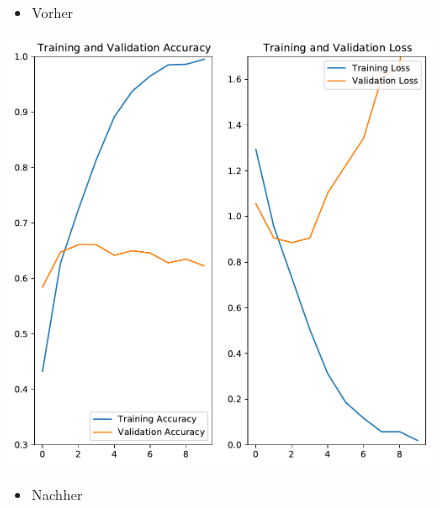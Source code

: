 \documentclass[t]{beamer}
\begin{document}
\begin{frame}
    \begin{figure}
        \begin{minipage}{0.5\textwidth}
            \begin{itemize}
                \item Vorher
            \end{itemize}
            \includegraphics[width=\textwidth]{./teach-plots/pre_augmentation-fixed.pdf}
        \end{minipage}\hfill
        \begin{minipage}{0.5\textwidth}
            \begin{itemize}
                \item Nachher
            \end{itemize}

\end{minipage}
\end{figure}
\end{frame}
\end{document}
